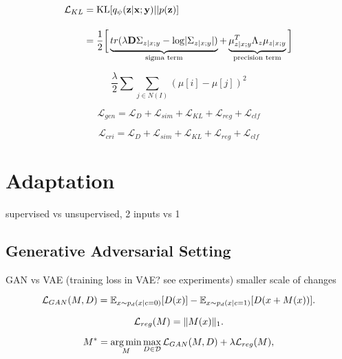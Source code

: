 \begin{equation}
	\begin{split}
		\mathcal{L}_{KL} & =
		\text{KL} [ q_{\psi} ( \mathbf{z} | \mathbf{x} ; \mathbf{y} ) || p ( \mathbf{z} ) ] \\[10pt]
		& = 
		\frac{1}{2} \bigg[
		\underbrace{
			tr( \lambda \mathbf{D} \Sigma_{z | x; y} - \log \abs{ \Sigma_{z | x; y} } ) \vphantom{\mu_{z | x; y}^{T}}
		}_{\text{sigma term}} +
		\underbrace{
			\mu_{z | x; y}^{T} \Lambda_{z} \mu_{z | x; y}
		}_{\text{precision term}} \bigg]
	\end{split}
\end{equation}

\begin{equation}
	\frac{\lambda}{2} \sum \sum_{j \in N(I)} ( \mu[i] - \mu[j])^{2}
\end{equation}



\begin{equation}
	\mathcal{L}_{gen} = \mathcal{L}_{D} + \mathcal{L}_{sim} + \mathcal{L}_{KL} + \mathcal{L}_{reg} + \mathcal{L}_{clf} 
\end{equation}

\begin{equation}
	\mathcal{L}_{cri} = \mathcal{L}_{D} + \mathcal{L}_{sim} + \mathcal{L}_{KL} + \mathcal{L}_{reg} + \mathcal{L}_{clf} 
\end{equation}



\section{Adaptation}
supervised vs unsupervised, 2 inputs vs 1

\subsection{Generative Adversarial Setting}
GAN vs VAE (training loss in VAE? see experiments)
smaller scale of changes

\begin{equation}
	\mathcal{L}_{GAN}(M, D) = \mathbb{E} _ { x \sim p_d(x | c = 0) } [ D (x) ] 
	 - \mathbb{E} _ { x \sim p_d(x | c = 1) } [ D (x + M(x)) ].
\end{equation}

\begin{equation}
	\mathcal{L}_{reg} (M) = \lVert M(x)\rVert_1.
\end{equation}

\begin{equation}
	M^* = \operatorname*{arg\,min}_M \max_{D \in \mathcal{D}} \mathcal{L}_{GAN}(M, D) + \lambda \mathcal{L}_{reg} (M),
\end{equation}

